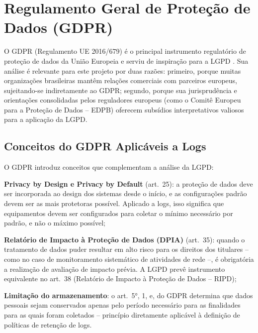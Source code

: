 \section{Regulamento Geral de Proteção de Dados (GDPR)}
\label{sec:gdpr}

O GDPR (Regulamento UE 2016/679) é o principal instrumento regulatório de proteção de dados da União Europeia e serviu de inspiração para a LGPD \cite{gdpr2016}. Sua análise é relevante para este projeto por duas razões: primeiro, porque muitas organizações brasileiras mantêm relações comerciais com parceiros europeus, sujeitando-se indiretamente ao GDPR; segundo, porque sua jurisprudência e orientações consolidadas pelos reguladores europeus (como o Comitê Europeu para a Proteção de Dados -- EDPB) oferecem subsídios interpretativos valiosos para a aplicação da LGPD.

\subsection{Conceitos do GDPR Aplicáveis a Logs}
\label{subsec:gdpr-logs}

O GDPR introduz conceitos que complementam a análise da LGPD:

\begin{alineas}
    \item \textbf{Privacy by Design e Privacy by Default} (art.\ 25): a proteção de dados deve ser incorporada ao design dos sistemas desde o início, e as configurações padrão devem ser as mais protetoras possível. Aplicado a logs, isso significa que equipamentos devem ser configurados para coletar o mínimo necessário por padrão, e não o máximo possível;
    \item \textbf{Relatório de Impacto à Proteção de Dados (DPIA)} (art.\ 35): quando o tratamento de dados puder resultar em alto risco para os direitos dos titulares -- como no caso de monitoramento sistemático de atividades de rede --, é obrigatória a realização de avaliação de impacto prévia. A LGPD prevê instrumento equivalente no art.\ 38 (Relatório de Impacto à Proteção de Dados -- RIPD);
    \item \textbf{Limitação do armazenamento}: o art.\ 5°, 1, e, do GDPR determina que dados pessoais sejam conservados apenas pelo período necessário para as finalidades para as quais foram coletados -- princípio diretamente aplicável à definição de políticas de retenção de logs.
\end{alineas}

